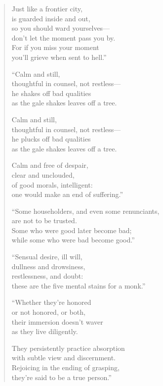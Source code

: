 \documentclass[12pt,openany]{book}%
\begin{document}
\begin{verse}
Just like a frontier city, \\
is guarded inside and out, \\
so you should ward yourselves—\\
don’t let the moment pass you by. \\
For if you miss your moment \\
you’ll grieve when sent to hell.” 

“Calm and still, \\
thoughtful in counsel, not restless—\\
he shakes off bad qualities \\
as the gale shakes leaves off a tree. 

Calm and still, \\
thoughtful in counsel, not restless—\\
he plucks off bad qualities \\
as the gale shakes leaves off a tree. 

Calm and free of despair, \\
clear and unclouded, \\
of good morals, intelligent: \\
one would make an end of suffering.” 

“Some householders, and even some renunciants, \\
are not to be trusted. \\
Some who were good later become bad; \\
while some who were bad become good.” 

“Sensual desire, ill will, \\
dullness and drowsiness, \\
restlessness, and doubt: \\
these are the five mental stains for a monk.” 

“Whether they’re honored \\
or not honored, or both, \\
their immersion doesn’t waver \\
as they live diligently. 

They persistently practice absorption \\
with subtle view and discernment. \\
Rejoicing in the ending of grasping, \\
they’re said to be a true person.” 


\end{verse}
\end{document}
